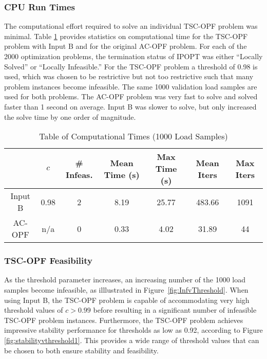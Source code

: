 \documentclass[lettersize,journal]{IEEEtran}
\begin{document}
\subsubsection{CPU Run Times}\label{Sec:cpu}
The computational effort required to solve an individual TSC-OPF problem was minimal.  Table \ref{Table:CompTimes} provides statistics on computational time for the TSC-OPF problem with Input B and for the original AC-OPF problem.  For each of the 2000 optimization problems, the termination status of IPOPT was either ``Locally Solved'' or ``Locally Infeasible.''  For the TSC-OPF problem a threshold of 0.98 is used, which was chosen to be restrictive but not too restrictive such that many problem instances become infeasible.  The same 1000 validation load samples are used for both problems.  The AC-OPF problem was very fast to solve and solved faster than 1 second on average.  Input B was slower to solve, but only increased the solve time by one order of magnitude.  
\setlength{\tabcolsep}{1pt} %
\renewcommand{\arraystretch}{1.3} %
\begin{table}[h!]
\vspace{-2pt}
\caption[]{\label{Table:CompTimes} Table of Computational Times (1000 Load Samples)}
\vspace{-15pt}
\begin{center}
\begin{tabular}{|c|c|c|c|c|c|c|} 
    \hline
    &$c$&\# Infeas.&Mean Time (s)&Max Time (s)&Mean Iters& Max Iters\\
	\hline
    Input B&0.98&2&8.19&25.77&483.66&1091\\
	\hline
    AC-OPF&n/a&0&0.33&4.02&31.89&44\\
    \hline
\end{tabular}
\end{center}
\vspace{-10pt}
\end{table}

\subsubsection{TSC-OPF Feasibility}
As the threshold parameter increases, an increasing number of the 1000 load samples become infeasible, as illlustrated in Figure~\ref{fig:InfvThreshold}.  When using Input B, the TSC-OPF problem is capable of accommodating very high threshold values of $c>0.99$ before resulting in a significant number of infeasible TSC-OPF problem instances.  Furthermore, the TSC-OPF problem achieves impressive stability performance for thresholds as low as 0.92, according to Figure \ref{fig:stabilityvthreshold1}. This provides a wide range of threshold values that can be chosen to both ensure stability and feasibility.
\end{document}
